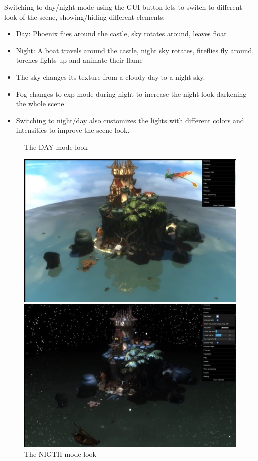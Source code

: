 \documentclass[10pt,a4paper]{article}
\begin{document}
Switching to day/night mode using the GUI button lets to switch to different look of the scene, showing/hiding different elements:

\begin{itemize}
 \item Day: Phoenix flies around  the castle, sky rotates around, leaves float
 \item Night: A boat travels around the castle, night sky rotates, fireflies fly around, torches lights up and animate their flame
\end{itemize}

\begin{itemize}
 \item The sky changes its texture from a cloudy day to a night sky.
 \item Fog changes to exp mode during night to increase the night look darkening the whole scene.
 \item Switching to night/day also customizes the lights with different colors and intensities to improve the scene look.
\end{itemize}
\begin{center}
\begin{figure}[H]
\caption{The DAY mode look}
\includegraphics[width=1\textwidth,keepaspectratio]{day}
\caption{The NIGTH mode look}
\includegraphics[width=1\textwidth,keepaspectratio]{night}
\end{figure}
\end{center}
\end{document}
